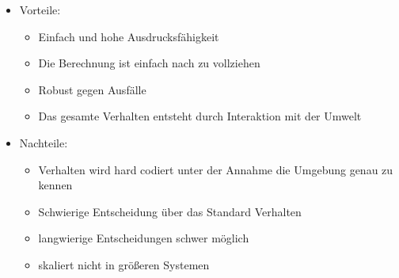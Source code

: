 \documentclass{article} %
\begin{document}
\begin{itemize}
\begin{enumerate}
		\end{enumerate}
		\item Vorteile:
		\begin{itemize}
			\item Einfach und hohe Ausdrucksfähigkeit
			\item Die Berechnung ist einfach nach zu vollziehen
			\item Robust gegen Ausfälle
			\item Das gesamte Verhalten entsteht durch Interaktion mit der Umwelt
		\end{itemize}
		\item Nachteile:
		\begin{itemize}
			\item Verhalten wird hard codiert unter der Annahme die Umgebung genau zu kennen
			\item Schwierige Entscheidung über das Standard Verhalten
			\item langwierige Entscheidungen schwer möglich
			\item skaliert nicht in größeren Systemen
		\end{itemize}
	\end{itemize}
\end{document}

